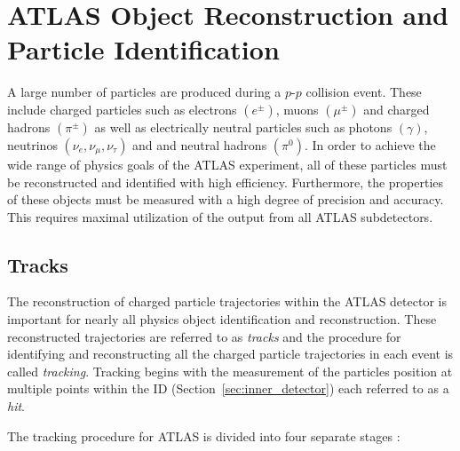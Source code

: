 \graphicspath{{Ch3_Reconstruction/figures/}}

\chapter{ATLAS Object Reconstruction and Particle Identification}
\label{ch:reconstruction}

A large number of particles are produced during a $p$-$p$ collision event.
These include charged particles such as electrons $(e^\pm)$, muons $(\mu^\pm)$ and charged hadrons $(\pi^\pm)$ as well as electrically neutral particles such as photons $(\gamma)$, neutrinos $(\nu_e, \nu_\mu, \nu_\tau)$ and and neutral hadrons $(\pi^0)$.
In order to achieve the wide range of physics goals of the ATLAS experiment, all of these particles must be reconstructed and identified with high efficiency.
Furthermore, the properties of these objects must be measured with a high degree of precision and accuracy.
This requires maximal utilization of the output from all ATLAS subdetectors.


\section{Tracks}
\label{sec:tracking}
The reconstruction of charged particle trajectories within the ATLAS detector is important for nearly all physics object identification and reconstruction.
These reconstructed trajectories are referred to as \textit{tracks} and the procedure for identifying and reconstructing all the charged particle trajectories in each event is called \textit{tracking}.
Tracking begins with the measurement of the particles position at multiple points within the ID (Section~\ref{sec:inner_detector}) each referred to as a \textit{hit}.

The tracking procedure for ATLAS is divided into four separate stages \cite{Salzburger:2015sgq}:

